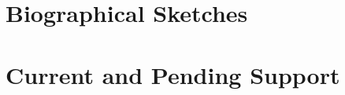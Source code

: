 \documentclass[11pt]{article}
\begin{document}


\setcounter{page}{1}







\setcounter{page}{1}
\justifying



\setcounter{page}{1}
\section{Biographical Sketches}


\setcounter{page}{1}
\section{Current and Pending Support}



\setcounter{page}{1}

\setcounter{page}{1}

\setcounter{page}{1}

\setcounter{page}{1}

\end{document}
